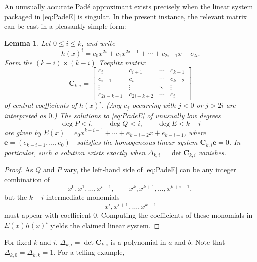 \documentclass{article}
\numberwithin{equation}{section}
\newtheorem{lem}[thm]{Lemma}
\theoremstyle{definition}
\theoremstyle{remark}
\newcommand{\<}{\left\langle}
\renewcommand{\>}{\right\rangle}
\begin{document}
An unusually accurate Pad\'e approximant exists precisely when the linear system packaged in \eqref{eq:PadeE} is singular. In the present instance, the relevant matrix can be cast in a pleasantly simple form:
\begin{lem} \label{lem:Pade_Toeplitz}
  Let $0 \leq i \leq k$, and write
  \begin{equation*}
    h(x)^i = c_{0}x^{2i} + c_1 x^{2i-1} + \cdots + c_{2i-1} x + c_{2i}.
  \end{equation*}
  Form the $(k-i) \times (k-i)$ Toeplitz matrix
  \begin{equation}
    \mathbf{C}_{k,i} = \begin{bmatrix}
      c_i & c_{i+1} & \cdots & c_{k-1} \\
      c_{i-1} & c_i & \cdots & c_{k-2} \\
      \vdots & \vdots & \ddots & \vdots \\
      c_{2i-k+1} & c_{2i-k+2} & \cdots & c_i
    \end{bmatrix}
  \end{equation}
  of central coefficients of $h(x)^i$. (Any $c_j$ occurring with $j < 0$ or $j > 2i$ are interpreted as $0$.)
  The solutions to \eqref{eq:PadeE} of unusually low degrees
  \begin{equation*}
    \deg P < i, \qquad \deg Q < i, \qquad \deg E < k - i
  \end{equation*}
  are given by $E(x) = e_0 x^{k-i-1} + \cdots + e_{k-i-2} x + e_{k-i-1}$, where $\mathbf{e} = (e_{k-i-1}, \ldots, e_0)^\top$ satisfies the homogeneous linear system $\mathbf{C}_{k,i} \mathbf{e} = 0$. In particular, such a solution exists exactly when $\Delta_{k,i} = \det \mathbf{C}_{k,i}$ vanishes.
\end{lem}
\begin{proof}
  As $Q$ and $P$ vary, the left-hand side of \eqref{eq:PadeE} can be any integer combination of
  \begin{equation*}
    x^0, x^1, \ldots, x^{i-1}, \qquad x^{k}, x^{k+1}, \ldots, x^{k+i-1},
  \end{equation*}
  but the $k - i$ intermediate monomials
  \begin{equation*}
    x^i, x^{i+1}, \ldots, x^{k-1}
  \end{equation*}
  must appear with coefficient $0$. Computing the coefficients of these monomials in $E(x) h(x)^i$ yields the claimed linear system.
\end{proof}
For fixed $k$ and $i$, $\Delta_{k,i} = \det \mathbf{C}_{k,i}$ is a polynomial in $a$ and $b$. Note that $\Delta_{k,0} = \Delta_{k,k} = 1$. For a telling example,
\end{document}

